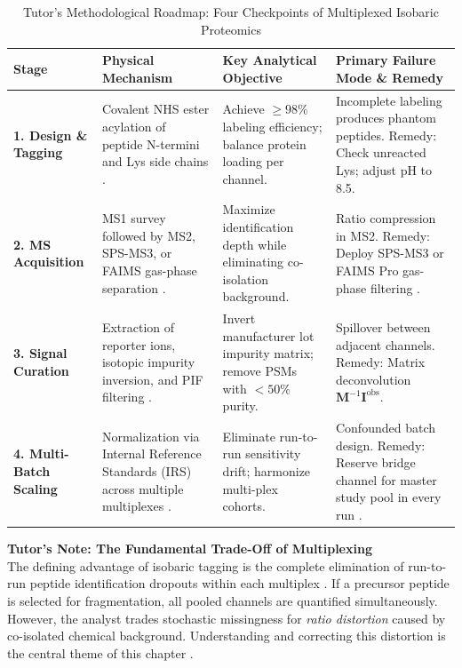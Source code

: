 \documentclass[11pt,oneside]{book}
\begin{document}
\begin{table}[ht]
\centering
\caption{Tutor's Methodological Roadmap: Four Checkpoints of Multiplexed Isobaric Proteomics}
\label{tab:tmt_roadmap}
\small
\begin{tabularx}{\textwidth}{l p{3.8cm} p{4.2cm} X}
\toprule
\textbf{Stage} & \textbf{Physical Mechanism} & \textbf{Key Analytical Objective} & \textbf{Primary Failure Mode \& Remedy} \\
\midrule
\textbf{1. Design \& Tagging} & Covalent NHS ester acylation of peptide N-termini and Lys side chains \cite{thompson2003tandem, li2020tmtpro}. & Achieve $\ge 98\%$ labeling efficiency; balance protein loading per channel. & Incomplete labeling produces phantom peptides. Remedy: Check unreacted Lys; adjust pH to 8.5. \\
\addlinespace
\textbf{2. MS Acquisition} & MS1 survey followed by MS2, SPS-MS3, or FAIMS gas-phase separation \cite{ting2011sps, pfammatter2020faims}. & Maximize identification depth while eliminating co-isolation background. & Ratio compression in MS2. Remedy: Deploy SPS-MS3 or FAIMS Pro gas-phase filtering \cite{hebert2018faims}. \\
\addlinespace
\textbf{3. Signal Curation} & Extraction of reporter ions, isotopic impurity inversion, and PIF filtering \cite{cox2008maxquant}. & Invert manufacturer lot impurity matrix; remove PSMs with $<50\%$ purity. & Spillover between adjacent channels. Remedy: Matrix deconvolution $\mathbf{M}^{-1} \mathbf{I}^{\text{obs}}$. \\
\addlinespace
\textbf{4. Multi-Batch Scaling} & Normalization via Internal Reference Standards (IRS) across multiple multiplexes \cite{plubell2017extended}. & Eliminate run-to-run sensitivity drift; harmonize multi-plex cohorts. & Confounded batch design. Remedy: Reserve bridge channel for master study pool in every run \cite{huang2020msstatstmt}. \\
\bottomrule
\end{tabularx}
\end{table}

\begin{notebox}
\textbf{Tutor's Note: The Fundamental Trade-Off of Multiplexing}\\
The defining advantage of isobaric tagging is the complete elimination of run-to-run peptide identification dropouts within each multiplex \cite{rauniyar2014isobaric}. If a precursor peptide is selected for fragmentation, all pooled channels are quantified simultaneously. However, the analyst trades stochastic missingness for \textit{ratio distortion} caused by co-isolated chemical background. Understanding and correcting this distortion is the central theme of this chapter \cite{ting2011sps, mcalister2014multinotch}.
\end{notebox}
\end{document}
